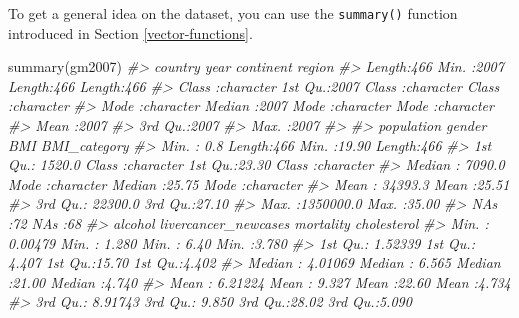 \documentclass[
]{book}
\newenvironment{Shaded}{\begin{snugshade}}{\end{snugshade}}
\newcommand{\CommentTok}[1]{\textcolor[rgb]{0.56,0.35,0.01}{\textit{#1}}}
\newcommand{\FunctionTok}[1]{\textcolor[rgb]{0.00,0.00,0.00}{#1}}
\newcommand{\NormalTok}[1]{#1}
\begin{document}
To get a general idea on the dataset, you can use the \texttt{summary()} function introduced in Section \ref{vector-functions}.

\begin{Shaded}
\begin{Highlighting}[]
\FunctionTok{summary}\NormalTok{(gm2007)}
\CommentTok{\#\textgreater{}    country               year       continent            region         }
\CommentTok{\#\textgreater{}  Length:466         Min.   :2007   Length:466         Length:466        }
\CommentTok{\#\textgreater{}  Class :character   1st Qu.:2007   Class :character   Class :character  }
\CommentTok{\#\textgreater{}  Mode  :character   Median :2007   Mode  :character   Mode  :character  }
\CommentTok{\#\textgreater{}                     Mean   :2007                                        }
\CommentTok{\#\textgreater{}                     3rd Qu.:2007                                        }
\CommentTok{\#\textgreater{}                     Max.   :2007                                        }
\CommentTok{\#\textgreater{}                                                                         }
\CommentTok{\#\textgreater{}    population           gender               BMI        BMI\_category      }
\CommentTok{\#\textgreater{}  Min.   :      0.8   Length:466         Min.   :19.90   Length:466        }
\CommentTok{\#\textgreater{}  1st Qu.:   1520.0   Class :character   1st Qu.:23.30   Class :character  }
\CommentTok{\#\textgreater{}  Median :   7090.0   Mode  :character   Median :25.75   Mode  :character  }
\CommentTok{\#\textgreater{}  Mean   :  34393.3                      Mean   :25.51                     }
\CommentTok{\#\textgreater{}  3rd Qu.:  22300.0                      3rd Qu.:27.10                     }
\CommentTok{\#\textgreater{}  Max.   :1350000.0                      Max.   :35.00                     }
\CommentTok{\#\textgreater{}  NA\textquotesingle{}s   :72                             NA\textquotesingle{}s   :68                        }
\CommentTok{\#\textgreater{}     alcohol         livercancer\_newcases   mortality      cholesterol   }
\CommentTok{\#\textgreater{}  Min.   : 0.00479   Min.   :  1.280      Min.   : 6.40   Min.   :3.780  }
\CommentTok{\#\textgreater{}  1st Qu.: 1.52339   1st Qu.:  4.407      1st Qu.:15.70   1st Qu.:4.402  }
\CommentTok{\#\textgreater{}  Median : 4.01069   Median :  6.565      Median :21.00   Median :4.740  }
\CommentTok{\#\textgreater{}  Mean   : 6.21224   Mean   :  9.327      Mean   :22.60   Mean   :4.734  }
\CommentTok{\#\textgreater{}  3rd Qu.: 8.91743   3rd Qu.:  9.850      3rd Qu.:28.02   3rd Qu.:5.090  }

\end{Highlighting}
\end{Shaded}
\end{document}
